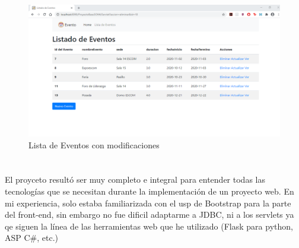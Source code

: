 \documentclass[10pt,a4paper]{article}
\begin{document}
\begin{itemize}
        \begin{figure}[H]
    	\includegraphics[scale=0.5]{images/listaDeEventos2.png}
    	\centering \linebreak \linebreak 
    	\caption{Lista de Eventos con modificaciones}
    	\label{img:final}
    \end{figure}  \hfill
\end{itemize}
\pagebreak



\section{\color{colorIPN}{Conclusión}}
El proyceto resultó ser muy completo e integral para entender todas las tecnologías que se necesitan durante la implementación de un proyecto web.
En mi experiencia, solo estaba familiarizada con el usp de Bootstrap para la parte del front-end, sin embargo no fue dificil adaptarme a JDBC, ni a los servlets ya qe siguen la línea de las herramientas web que he utilizado (Flask para python, ASP C#, etc.)


\pagebreak


\section{\color{colorIPN}{Referencias Bibliográficas}}
\end{document}
